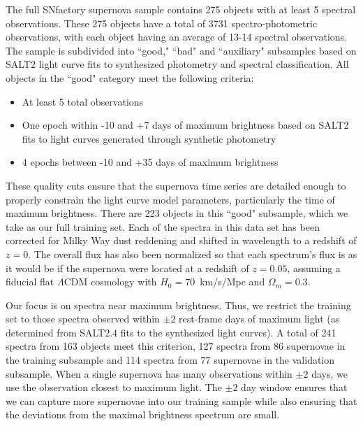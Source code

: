 The full SNfactory supernova sample contains 275 objects with at least 5 spectral observations. These 275 objects have a total of 3731 spectro-photometric observations, with each object having an average of 13-14 spectral observations. The sample is subdivided into ``good," ``bad" and ``auxiliary" subsamples based on SALT2 light curve fits to synthesized photometry and spectral classification. All objects in the ``good" category meet the following criteria:
\begin{itemize}
    \item At least 5 total observations
    \item One epoch within -10 and +7 days of maximum brightness based on SALT2 fits to light curves generated through synthetic photometry
    \item 4 epochs between -10 and +35 days of maximum brightness 
\end{itemize}
These quality cuts ensure that the supernova time series are detailed enough to properly constrain the light curve model parameters, particularly the time of maximum brightness. There are 223 objects in this ``good" subsample, which we take as our full training set. Each of the spectra in this data set has been corrected for Milky Way dust reddening and shifted in wavelength to a redshift of $z=0$. The overall flux has also been normalized so that each spectrum's flux is as it would be if the supernova were located at a redshift of $z=0.05$, assuming a fiducial flat $\Lambda$CDM cosmology with $H_0=70$~km/s/Mpc and $\Omega_m = 0.3$.

Our focus is on spectra near maximum brightness. Thus, we restrict the training set to those spectra observed within $\pm 2$ rest-frame days of maximum light (as determined from SALT2.4 fits to the synthesized light curves). A total of 241 spectra from 163 objects meet this criterion, 127 spectra from 86 supernovae in the training subsample and 114 spectra from 77 supernovae in the validation subsample. When a single supernova has many observations within $\pm 2$ days, we use the observation closest to maximum light. The $\pm 2$ day window ensures that we can capture more supernovae into our training sample while also ensuring that the deviations from the maximal brightness spectrum are small.


